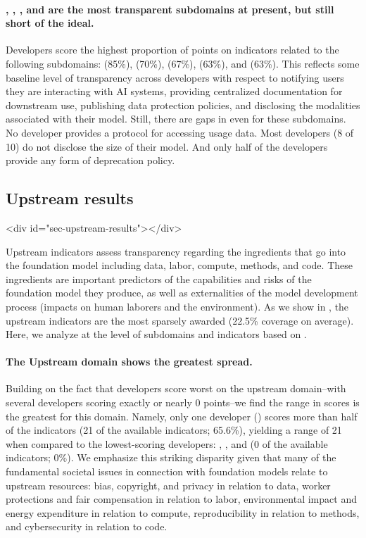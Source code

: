 \documentclass[screen, authorversion, acmsmall]{acmart}
\begin{document}
\paragraph{\modelbasics, \capabilities, \limitations, and \dataprotection are the most transparent subdomains at present, but still short of the ideal.}
Developers score the highest proportion of points on indicators related to the following subdomains: \interface (85\%), \documentation (70\%), \dataprotection (67\%), \modelbasics (63\%), and \updates (63\%).
This reflects some baseline level of transparency across developers with respect to notifying users they are interacting with AI systems, providing centralized documentation for downstream use, publishing data protection policies, and disclosing the modalities associated with their model. 
Still, there are gaps in even for these subdomains. 
No developer provides a protocol for accessing usage data.
Most developers (8 of 10) do not disclose the size of their model.
And only half of the developers provide any form of deprecation policy.

\hypertarget{upstream-results}{\subsection{Upstream results}}
<div id="sec-upstream-results"></div>


Upstream indicators assess transparency regarding the ingredients that go into the foundation model including data, labor, compute, methods, and code. 
These ingredients are important predictors of the capabilities and risks of the foundation model they produce, as well as externalities of the model development process (\eg impacts on human laborers and the environment). 
As we show in , the upstream indicators are the most sparsely awarded (22.5\% coverage on average).
Here, we analyze at the level of subdomains and indicators based on . 

\paragraph{The Upstream domain shows the greatest spread.}
Building on the fact that developers score worst on the upstream domain--with several developers scoring exactly or nearly 0 points--we find the range in scores is the greatest for this domain. Namely, only one developer (\huggingface) scores more than half of the indicators (21 of the available \numupstreamindicators indicators; 65.6\%), yielding a range of 21 when compared to the lowest-scoring developers: \aitwentyone, \inflection, and \amazon (0 of the available \numupstreamindicators indicators; 0\%).
We emphasize this striking disparity given that many of the fundamental societal issues in connection with foundation models relate to upstream resources: bias, copyright, and privacy in relation to data, worker protections and fair compensation in relation to labor, environmental impact and energy expenditure in relation to compute, reproducibility in relation to methods, and cybersecurity in relation to code. 
\end{document}
